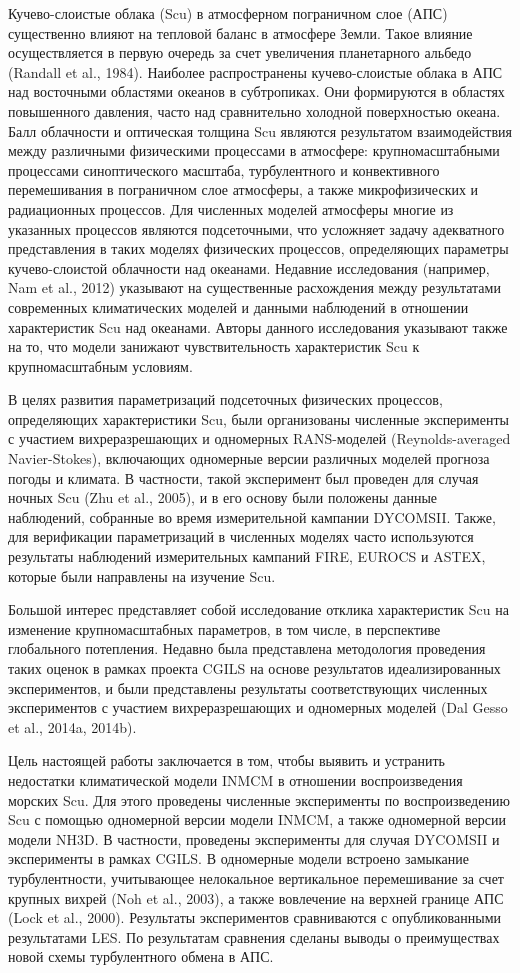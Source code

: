 \documentclass[12pt]{article}
\begin{document}
Кучево-слоистые облака (Scu) в атмосферном пограничном слое (АПС) существенно влияют на тепловой баланс в атмосфере Земли. Такое влияние осуществляется в первую очередь за счет увеличения планетарного альбедо (Randall et al., 1984). Наиболее распространены кучево-слоистые облака в АПС над восточными областями океанов в субтропиках. Они формируются в областях повышенного давления, часто над сравнительно холодной поверхностью океана. Балл облачности и оптическая толщина Scu являются результатом взаимодействия между различными физическими процессами в атмосфере: крупномасштабными процессами синоптического масштаба, турбулентного и конвективного перемешивания в пограничном слое атмосферы, а также микрофизических и радиационных процессов. Для численных моделей атмосферы многие из указанных процессов являются подсеточными, что усложняет задачу адекватного представления в таких моделях физических процессов, определяющих параметры кучево-слоистой облачности над океанами. Недавние исследования (например, Nam et al., 2012) указывают на существенные расхождения между результатами современных климатических моделей и данными наблюдений в отношении характеристик Scu над океанами. Авторы данного исследования указывают также на то, что модели занижают чувствительность характеристик Scu к крупномасштабным условиям.

В целях развития параметризаций подсеточных физических процессов, определяющих характеристики Scu, были организованы численные эксперименты с участием вихреразрешающих и одномерных RANS-моделей (Reynolds-averaged Navier-Stokes), включающих одномерные версии различных моделей прогноза погоды и климата. В частности, такой эксперимент был проведен для случая ночных Scu (Zhu et al., 2005), и в его основу были положены данные наблюдений, собранные во время измерительной кампании DYCOMSII. Также, для верификации параметризаций в численных моделях часто используются результаты наблюдений измерительных кампаний  FIRE, EUROCS и ASTEX, которые были направлены на изучение Scu.

Большой интерес представляет собой исследование отклика характеристик Scu на изменение крупномасштабных параметров, в том числе, в перспективе глобального потепления. Недавно была представлена методология проведения таких оценок в рамках проекта CGILS на основе результатов идеализированных экспериментов, и были представлены результаты соответствующих численных экспериментов с участием вихреразрешающих и одномерных моделей (Dal Gesso et al., 2014a, 2014b).

Цель настоящей работы заключается в том, чтобы выявить и устранить недостатки климатической модели INMCM в отношении воспроизведения морских Scu. Для этого проведены численные эксперименты по воспроизведению Scu с помощью одномерной версии модели INMCM, а также одномерной версии модели NH3D. В частности, проведены эксперименты для случая DYCOMSII и эксперименты в рамках CGILS. В одномерные модели встроено замыкание турбулентности, учитывающее нелокальное вертикальное перемешивание за счет крупных вихрей (Noh et al., 2003), а также вовлечение на верхней границе АПС (Lock et al., 2000). Результаты экспериментов сравниваются с опубликованными результатами LES. По результатам сравнения сделаны выводы о преимуществах новой схемы турбулентного обмена в АПС.
\end{document}
